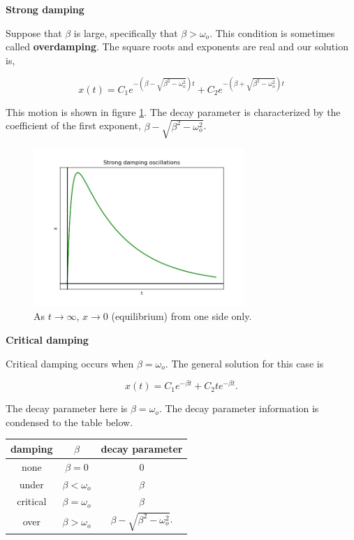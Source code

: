 {\vspace{0.35cm} \bfseries \noindent Strong damping}

Suppose that $\beta$ is large, specifically that $\beta > \omega_o$. This condition is sometimes called {\bfseries overdamping}. The square roots and exponents are real and our solution is,

\begin{equation*}
    x(t) = C_1 e^{-(\beta - \sqrt{\beta^2 -\omega_o^2}) t} + C_2 e^{-(\beta + \sqrt{\beta^2 -\omega_o^2}) t}
\end{equation*}

This motion is shown in figure \ref{fig:strong_damped_osc}. The decay parameter is characterized by the coefficient of the first exponent, $\beta - \sqrt{\beta^2 - \omega_o^2}$.

\begin{figure}[h]
    \centering
    \includegraphics[width=8cm]{Classical_Mechanics/2.12-damp-osc/strong_damped_osc.png}
    \caption{As $t \rightarrow \infty$, $x \rightarrow 0$ (equilibrium) from one side only.}
    \label{fig:strong_damped_osc}
\end{figure}


{\vspace{0.35cm} \bfseries \noindent Critical damping}

Critical damping occurs when $\beta = \omega_o$. The general solution for this case is

\begin{equation*}
    x(t) = C_1 e^{-\beta t} + C_2 t e^{-\beta t}.
\end{equation*}

The decay parameter here is $\beta = \omega_o$. The decay parameter information is condensed to the table below.

\vspace{0.35cm}

\begin{table}[h]
    \centering
    \begin{tabular}{c c c}
        damping & $\beta$ & decay parameter\\
        \hline
        none & $\beta = 0$ & 0\\
        under & $\beta < \omega_o$ & $\beta$ \\
        critical & $\beta = \omega_o$ & $\beta$ \\
        over & $\beta > \omega_o$ & $\beta - \sqrt{\beta^2 - \omega_o^2}$.
    \end{tabular}
\end{table}


